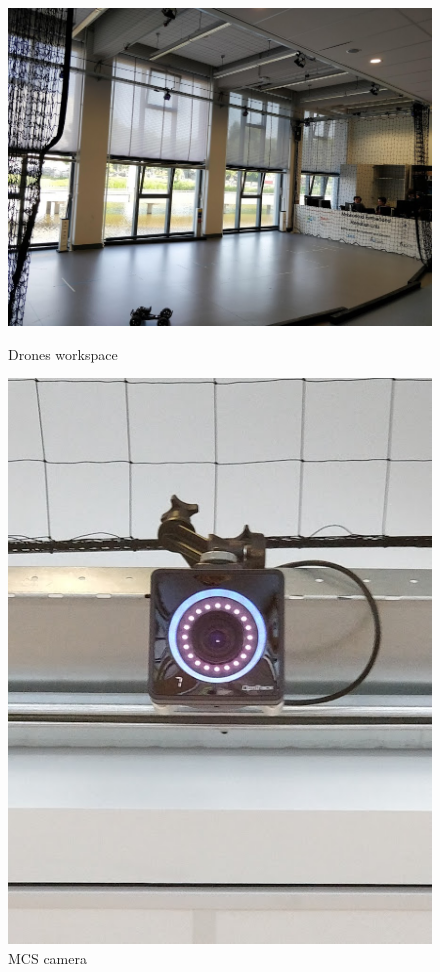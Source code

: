 \begin{figure}
	\centering
	\begin{minipage}{.5\textwidth}
		\centering
		\includegraphics[width=1\linewidth]{Figures/workspace}
		\caption{Drones workspace}
		\label{fig::workspace}
	\end{minipage}%
	\begin{minipage}{.5\textwidth}
		\centering
		\includegraphics[width=.5\linewidth]{Figures/camera}
		\caption{\ac{MCS} camera}
		\label{fig::camera}
	\end{minipage}
\end{figure}

